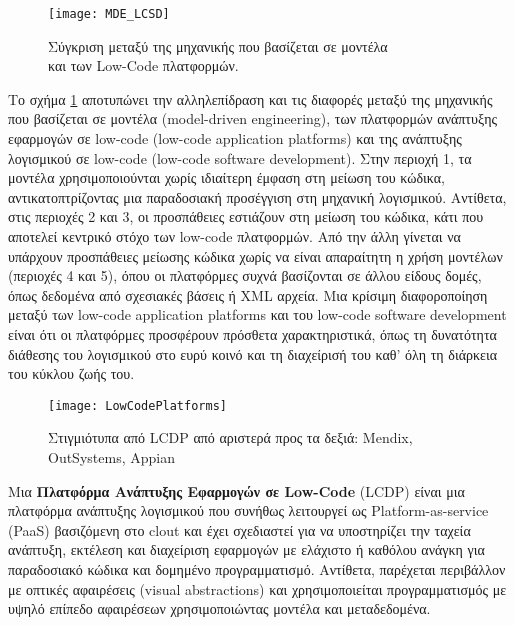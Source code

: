         \begin{figure}[h!] \noindent \centering
                \texttt{[image: MDE\_LCSD]}
                \caption{\centering Σύγκριση μεταξύ της μηχανικής που βασίζεται σε μοντέλα \\ και των Low-Code πλατφορμών. \cite{MDELow}}
                \label{fig:MDE_LCSD}
        \end{figure}

        Το σχήμα \ref{fig:MDE_LCSD} αποτυπώνει την αλληλεπίδραση και τις διαφορές μεταξύ της μηχανικής που βασίζεται σε μοντέλα (model-driven engineering), των πλατφορμών ανάπτυξης εφαρμογών σε low-code (low-code application platforms) και της ανάπτυξης λογισμικού σε low-code (low-code software development). Στην περιοχή 1, τα μοντέλα χρησιμοποιούνται χωρίς ιδιαίτερη έμφαση στη μείωση του κώδικα, αντικατοπτρίζοντας μια παραδοσιακή προσέγγιση στη μηχανική λογισμικού.
        Αντίθετα, στις περιοχές 2 και 3, οι προσπάθειες εστιάζουν στη μείωση του κώδικα, κάτι που αποτελεί κεντρικό στόχο των low-code πλατφορμών. Από την άλλη γίνεται να υπάρχουν προσπάθειες μείωσης κώδικα χωρίς να είναι απαραίτητη η χρήση μοντέλων (περιοχές 4 και 5), όπου οι πλατφόρμες συχνά βασίζονται σε άλλου είδους δομές, όπως δεδομένα από σχεσιακές βάσεις ή XML αρχεία. Μια κρίσιμη διαφοροποίηση μεταξύ των low-code application platforms και του low-code software development είναι ότι οι πλατφόρμες προσφέρουν πρόσθετα χαρακτηριστικά, όπως τη δυνατότητα διάθεσης του λογισμικού στο ευρύ κοινό και τη διαχείρισή του καθ' όλη τη διάρκεια του κύκλου ζωής του.

        \begin{figure}[h!] \noindent \centering
                \texttt{[image: LowCodePlatforms]}
                \caption{Στιγμιότυπα από LCDP από αριστερά προς τα δεξιά: Mendix, OutSystems, Appian \cite{LowCodeMendix}}
        \end{figure}

        Μια \textbf{Πλατφόρμα Ανάπτυξης Εφαρμογών σε Low-Code} (LCDP) είναι μια πλατφόρμα ανάπτυξης λογισμικού που συνήθως λειτουργεί ως Platform-as-service (PaaS) βασιζόμενη στο clout και έχει σχεδιαστεί για να υποστηρίζει την ταχεία ανάπτυξη, εκτέλεση και διαχείριση εφαρμογών με ελάχιστο ή καθόλου ανάγκη για παραδοσιακό κώδικα και δομημένο προγραμματισμό. Αντίθετα, παρέχεται περιβάλλον με οπτικές αφαιρέσεις (visual abstractions) και χρησιμοποιείται προγραμματισμός με υψηλό επίπεδο αφαιρέσεων χρησιμοποιώντας μοντέλα και μεταδεδομένα.

